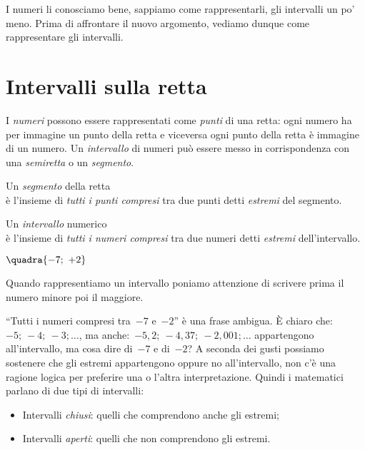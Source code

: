 I numeri li conosciamo bene, sappiamo come rappresentarli, gli intervalli
un po' meno.
Prima di affrontare il nuovo argomento, vediamo dunque come rappresentare gli 
intervalli.

\section{Intervalli sulla retta}
\label{sec:dis_intervalli}

I \emph{numeri} possono essere rappresentati come \emph{punti} di una retta: 
ogni numero ha per immagine un punto della retta e viceversa ogni punto della 
retta è immagine di un numero. 
Un \emph{intervallo} di numeri può essere messo in corrispondenza con una 
\emph{semiretta} o un \emph{segmento}.
\begin{multicols}{2}
Un \emph{segmento} della retta \\
è l'insieme di \emph{tutti i punti compresi} tra due punti detti 
\emph{estremi} del segmento. 
\begin{center}
\end{center}

Un \emph{intervallo} numerico \\
è l'insieme di \emph{tutti i numeri compresi} tra due numeri 
detti \emph{estremi} dell'intervallo. 

\vspace{1em}
\hspace{20mm} \(\quadra{-7;~+2}\)
\end{multicols}

\osservazione Quando rappresentiamo un intervallo poniamo attenzione di 
scrivere prima il numero minore poi il maggiore.

``Tutti i numeri compresi tra~\(-7\) e~\(-2\)'' è una frase ambigua. 
È chiaro che:~\(-5;~-4;~-3; \dots\), ma anche:~\(-5,2;~-4,37;~-2,001; \dots\)  
appartengono all'intervallo, ma cosa dire di~\(-7\) e di~\(-2\)? A seconda dei 
gusti possiamo sostenere che gli estremi appartengono oppure no all'intervallo, 
non c'è una ragione logica per preferire una o l'altra interpretazione. 
Quindi i matematici parlano di due tipi di intervalli: 

\begin{itemize} [noitemsep]
 \item Intervalli \emph{chiusi}: quelli che comprendono anche gli estremi;
 \item Intervalli \emph{aperti}: quelli che non comprendono gli estremi.
\end{itemize}

